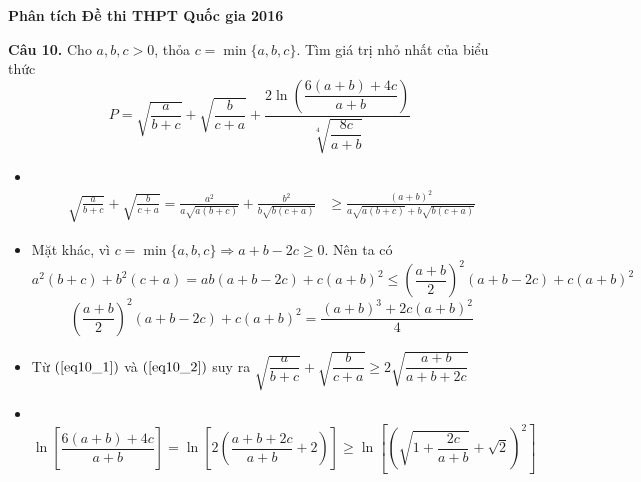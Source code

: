 \documentclass[11pt]{beamer} %
\newcommand\FontviTen{\fontsize{8.5}{7.2}\selectfont}
\newcommand{\cau}[2]{\begin{block}{}
		{\color{red}\textbf{Câu #1.}} #2
	\end{block}
}
\begin{document}
\begin{frame}{\textbf{\qquad Phân tích Đề thi THPT Quốc gia 2016}}~\\[-18pt]
	\FontviTen
	\cau{10}{Cho $a, b, c>0$, thỏa $c=\min\{a,b,c\}$. Tìm giá trị nhỏ nhất của biểu thức\\[-2pt]
		\begin{equation}\label{eq_pt10}
			P=\sqrt{\dfrac{a}{b+c}}+\sqrt{\dfrac{b}{c+a}}+\dfrac{2\ln\left( \dfrac{6(a+b)+4c}{a+b}\right)}{\sqrt[4]{\dfrac{8c}{a+b}}}
		\end{equation}}\pause
	\begin{itemize}
		\item ~\\[-24pt]
		\begin{align}
			\sqrt{\frac{a}{b+c}}+\sqrt{\frac{b}{c+a}}=\frac{a^2}{a\sqrt{a(b+c)}} +\frac{b^2}{b\sqrt{b(c+a)}}&\geq \frac{(a+b)^2}{a\sqrt{a(b+c)}+ b\sqrt{b(c+a)}}\label{eq10_1}
		\end{align}
		\item Mặt khác, vì $c=\min \{a,b,c\}\Rightarrow a+b-2c\geq 0$. Nên ta có
		$$a^2(b+c)+b^2(c+a)=ab(a+b-2c)+c(a+b)^2\leq \left(\frac{a+b}{2}\right)^2(a+b-2c)+c(a+b)^2$$
		\begin{equation}\label{eq10_2}
			\left(\frac{a+b}{2}\right)^2(a+b-2c)+c(a+b)^2=\frac{(a+b)^3+2c(a+b)^2}{4}
		\end{equation}
		\item Từ $(\ref{eq10_1})$ và $(\ref{eq10_2})$ suy ra $\sqrt{\dfrac{a}{b+c}}+\sqrt{\dfrac{b}{c+a}}\geq 2\sqrt{\dfrac{a+b}{a+b+2c}}$\\[12pt]
		\item ~\\[-27pt]
		\begin{equation}\label{eq10_3}
		\ln\left[\frac{6(a+b)+4c}{a+b}\right]=\ln\left[2\left(\frac{a+b+2c}{a+b}+2\right)\right]\geq \ln\left[\left(\sqrt{1+\frac{2c}{a+b}}+\sqrt{2}\right)^2\right]
		\end{equation}
	\end{itemize}
\end{frame}
\end{document}
